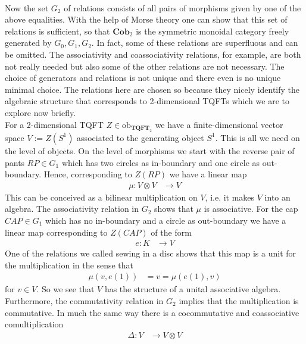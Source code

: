 \\
Now the set $G_{2}$ of relations consists of all pairs of morphisms given by one of the above equalities. With the help of Morse theory one can show that this set of relations is sufficient, so that $\mathbf{Cob}_{2}$ is the symmetric monoidal category freely generated by $G_{0},G_{1},G_{2}$. In fact, some of these relations are superfluous and can be omitted. The associativity and coassociativity relations, for example, are both not really needed but also some of the other relations are not necessary. The choice of generators and relations is not unique and there even is no unique minimal choice. The relations here are chosen so because they nicely identify the algebraic structure that corresponds to 2-dimensional TQFTs which we are to explore now briefly.
\\
For a 2-dimensional TQFT $Z \in \mathrm{ob}_{\mathbf{TQFT}_{2}}$ we have a finite-dimensional vector space $V := Z(S^{1})$ associated to the generating object $S^{1}$. This is all we need on the level of objects. On the level of morphisms we start with the reverse pair of pants $RP \in G_{1}$ which has two circles as in-boundary and one circle as out-boundary. Hence, corresponding to $Z(RP)$ we have a linear map
\begin{align*}
  \mu
  \colon
  V
  \otimes
  V
  &\to
  V
\end{align*}
This can be conceived as a bilinear multiplication on $V$, i.e. it makes $V$ into an algebra. The associativity relation in $G_{2}$ shows that $\mu$ is associative. For the cap $CAP \in G_{1}$ which has no in-boundary and a circle as out-boundary we have a linear map corresponding to $Z(CAP)$ of the form
\begin{align*}
  e
  \colon
  K
  &\to
  V
\end{align*}
One of the relations we called sewing in a disc shows that this map is a unit for the multiplication in the sense that
\begin{align*}
  \mu
  \left(
    v
    ,
    e(1)
  \right)
  &=
  v
  =
  \mu
  \left(
    e(1)
    ,
    v
  \right)
\end{align*}
for $v \in V$. So we see that $V$ has the structure of a unital associative algebra. Furthermore, the commutativity relation in $G_{2}$ implies that the multiplication is commutative. In much the same way there is a cocommutative and coassociative comultiplication
\begin{align*}
  \Delta
  \colon
  V
  &\to
  V
  \otimes
  V
\end{align*}
